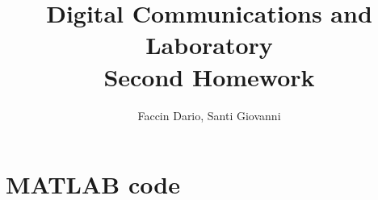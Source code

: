 \documentclass[10pt]{article}
\begin{document}
	\title{Digital Communications and Laboratory \\ Second Homework}
	\author{Faccin Dario, Santi Giovanni}
	\date{}
	\maketitle
	\section*{MATLAB code}
	
	
	
	
	
	
	
	
	
	
	
	\clearpage
	
	
	
	
	
	
	
	
\end{document}
